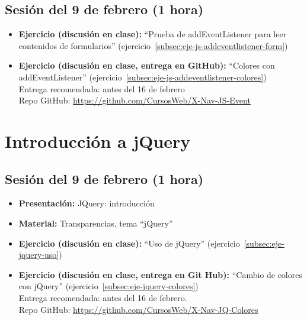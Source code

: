 \documentclass[a4paper,12pt]{report}
\begin{document}
\subsection{Sesión del 9 de febrero (1 hora)}

\begin{itemize}
\item \textbf{Ejercicio (discusión en clase):} ``Prueba de addEventListener para leer contenidos de formularios'' (ejercicio~\ref{subsec:eje-js-addeventlistener-form})
\item \textbf{Ejercicio (discusión en clase, entrega en GitHub):} ``Colores con addEventListener'' (ejercicio~\ref{subsec:eje-js-addeventlistener-colores}) \\
  Entrega recomendada: antes del 16 de febrero \\
  Repo GitHub: \url{https://github.com/CursosWeb/X-Nav-JS-Event} \\
\end{itemize}


\section{Introducción a jQuery}


\subsection{Sesión del 9 de febrero (1 hora)}

\begin{itemize}
\item \textbf{Presentación:} JQuery: introducción
\item \textbf{Material:} Transparencias, tema ``jQuery''
\item \textbf{Ejercicio (discusión en clase):} ``Uso de jQuery'' (ejercicio~\ref{subsec:eje-jquery-uso})
\item \textbf{Ejercicio (discusión en clase, entrega en Git Hub):} ``Cambio de colores con jQuery'' (ejercicio~\ref{subsec:eje-jquery-colores}) \\
  Entrega recomendada: antes del 16 de febrero.  \\
  Repo GitHub: \url{https://github.com/CursosWeb/X-Nav-JQ-Colores} \\
\end{itemize}
\end{document}

